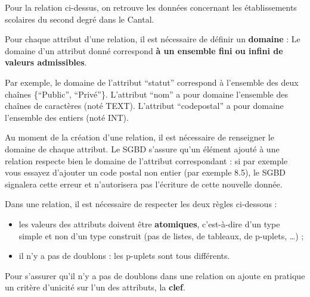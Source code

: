 \documentclass[
  letterpaper,
  DIV=11,
  numbers=noendperiod]{scrartcl}
\providecommand{\tightlist}{%
  \setlength{\itemsep}{0pt}\setlength{\parskip}{0pt}}\usepackage{longtable,booktabs,array}
\begin{document}
Pour la relation ci-dessus, on retrouve les données concernant les
établissements scolaires du second degré dans le Cantal.

Pour chaque attribut d'une relation, il est nécessaire de définir un
\textbf{domaine} : Le domaine d'un attribut donné correspond \textbf{à
un ensemble fini ou infini de valeurs admissibles}.

Par exemple, le domaine de l'attribut ``statut'' correspond à l'ensemble
des deux chaînes \{``Public'', ``Privé''\}. L'attribut ``nom'' a pour
domaine l'ensemble des chaînes de caractères (noté TEXT). L'attribut
``codepostal'' a pour domaine l'ensemble des entiers (noté INT).

Au moment de la création d'une relation, il est nécessaire de renseigner
le domaine de chaque attribut. Le SGBD s'assure qu'un élément ajouté à
une relation respecte bien le domaine de l'attribut correspondant : si
par exemple vous essayez d'ajouter un code postal non entier (par
exemple 8.5), le SGBD signalera cette erreur et n'autorisera pas
l'écriture de cette nouvelle donnée.

\begin{tcolorbox}[enhanced jigsaw, opacityback=0, bottomrule=.15mm, left=2mm, colframe=quarto-callout-important-color-frame, arc=.35mm, toprule=.15mm, title=\textcolor{quarto-callout-important-color}{\faExclamation}\hspace{0.5em}{Règles à respecter}, titlerule=0mm, breakable, colback=white, opacitybacktitle=0.6, bottomtitle=1mm, colbacktitle=quarto-callout-important-color!10!white, rightrule=.15mm, toptitle=1mm, coltitle=black, leftrule=.75mm]

Dans une relation, il est nécessaire de respecter les deux règles
ci-dessous :

\begin{itemize}
\tightlist
\item
  les valeurs des attributs doivent être \textbf{atomiques},
  c'est-à-dire d'un type simple et non d'un type construit (pas de
  listes, de tableaux, de p-uplets, \ldots) ;
\item
  il n'y a pas de doublons : les p-uplets sont tous différents.
\end{itemize}

\end{tcolorbox}

Pour s'assurer qu'il n'y a pas de doublons dans une relation on ajoute
en pratique un critère d'unicité sur l'un des attributs, la
\textbf{clef}.
\end{document}
